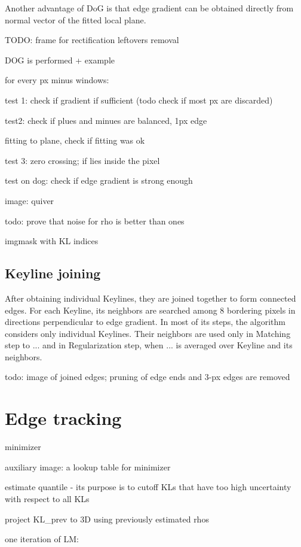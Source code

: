 Another advantage of DoG is that edge gradient can be obtained directly from normal vector of the fitted local plane.

TODO:
frame for rectification leftovers removal

DOG is performed + example

for every px minus windows:

test 1: check if gradient if sufficient (todo check if most px are discarded)

test2: check if plues and minues are balanced, 1px edge

fitting to plane, check if fitting was ok

test 3: zero crossing; if lies inside the pixel

test on dog: check if edge gradient is strong enough

image: quiver

todo: prove that noise for rho is better than ones

imgmask with KL indices

\subsection{Keyline joining}

After obtaining individual Keylines, they are joined together to form connected edges.
For each Keyline, its neighbors are searched among 8 bordering pixels in directions perpendicular to edge gradient.
In most of its steps, the algorithm considers only individual Keylines. Their neighbors are used only in Matching step to ... %
and in Regularization step, when ... %
is averaged over Keyline and its neighbors.

todo: image of joined edges; pruning of edge ends and 3-px edges are removed



\section{Edge tracking}


minimizer

auxiliary image: a lookup table for minimizer

estimate quantile - its purpose is to cutoff KLs that have too high uncertainty with respect to all KLs

project KL\_prev to 3D using previously estimated rhos

one iteration of LM:


